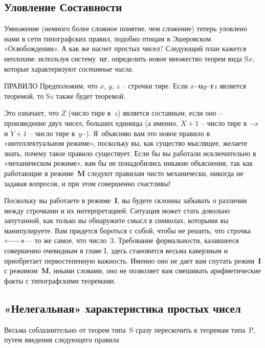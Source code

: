 \documentclass[../main.tex]{subfiles}
\begin{document}
\subsection{Уловление Составности}

Умножение (немного более сложное понятие, чем сложение) теперь уловлено нами в сети типографских правил, подобно птицам в Эшеровском «Освобождении». А как же насчет простых чисел? Следующий план кажется неплохим: используя систему~\textbf{ur}, определить новое множество теорем вида S$x$, которые характеризуют \emph{составные числа}.

\begin{mybox}{ПРАВИЛО}
    Предположим, что $x$, $y$, $z$ \--- строчки тире.
    Если \textbf{$x$--u$y$--r$z$} является теоремой, то S$z$ также будет теоремой.
\end{mybox}

Это означает, что $Z$ (число тире в~$z$) является составным, если оно \--- произведение двух чисел, больших единицы (а именно, $X + 1$ \--- число тире в~\textbf{--$x$} и $Y + 1$ \--- число тире в~\textbf{$y$--}). Я~объясняю вам это новое правило в «интеллектуальном режиме», поскольку вы, как существо мыслящее, желаете знать, почему такое правило существует. Если бы вы работали исключительно в «механическом режиме», вам бы не понадобились никакие объяснения, так как работающие в режиме~\textbf{M} следуют правилам чисто механически, никогда не задавая вопросов, и при этом совершенно счастливы!

Поскольку вы работаете в режиме~\textbf{I}, вы будете склонны забывать о различии между строчками и их интерпретацией. Ситуация может стать довольно запутанной, как только вы обнаружите смысл в символах, которыми вы манипулируете. Вам придется бороться с собой, чтобы не решить, что строчка «\textbf{--{}--{}--»}--- то же самое, что число~3.
Требование формальности, казавшееся совершенно очевидным в главе I, здесь становится весьма каверзным и приобретает первостепенную важность. Именно оно не дает вам спутать режим~\textbf{I} с режимом~\textbf{M}, иными словами, оно не позволяет вам смешивать арифметические факты с типографскими теоремами.


\subsection{«Нелегальная» характеристика простых чисел}

Весьма соблазнительно от теорем типа~S сразу перескочить к теоремам типа~P, путем введения следующего правила
\end{document}
